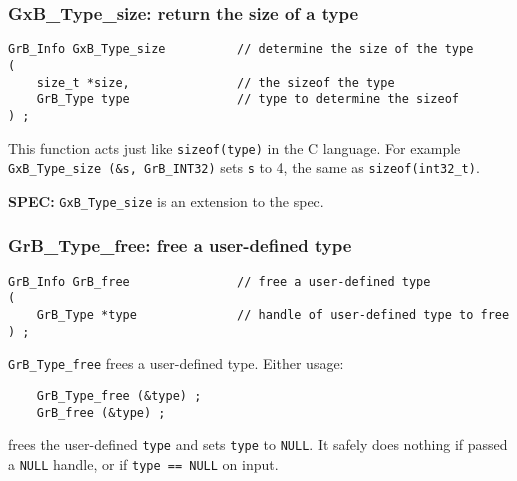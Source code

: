 \documentclass[12pt]{article}
\begin{document}
\subsubsection{{\sf GxB\_Type\_size:} return the size of a type}

\begin{mdframed}[userdefinedwidth=6in]
{\footnotesize
\begin{verbatim}
GrB_Info GxB_Type_size          // determine the size of the type
(
    size_t *size,               // the sizeof the type
    GrB_Type type               // type to determine the sizeof
) ;
\end{verbatim}
}\end{mdframed}

This function acts just like \verb'sizeof(type)' in the C language.  For
example \verb'GxB_Type_size (&s, GrB_INT32)' sets \verb's' to 4, the same as
\verb'sizeof(int32_t)'.

\begin{spec}
{\bf SPEC:} \verb'GxB_Type_size' is an extension to the spec.
\end{spec}

\newpage
\subsubsection{{\sf GrB\_Type\_free:} free a user-defined type}
\label{type_free}

\begin{mdframed}[userdefinedwidth=6in]
{\footnotesize
\begin{verbatim}
GrB_Info GrB_free               // free a user-defined type
(
    GrB_Type *type              // handle of user-defined type to free
) ;
\end{verbatim}
}\end{mdframed}

\verb'GrB_Type_free' frees a user-defined type.
Either usage:

    {\small
    \begin{verbatim}
    GrB_Type_free (&type) ;
    GrB_free (&type) ; \end{verbatim}}

\noindent
frees the user-defined \verb'type' and
sets \verb'type' to \verb'NULL'.
It safely does nothing if passed a \verb'NULL'
handle, or if \verb'type == NULL' on input.
\end{document}
